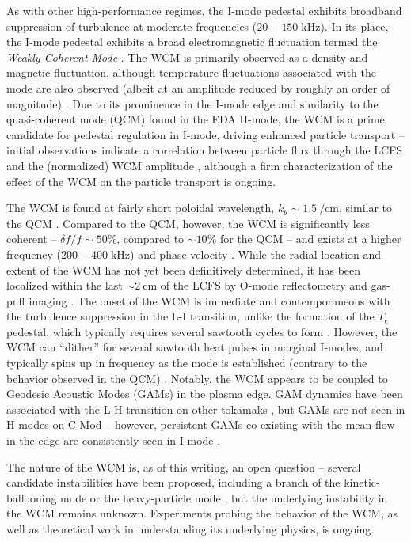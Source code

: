 As with other high-performance regimes, the I-mode pedestal exhibits broadband suppression of turbulence at moderate frequencies ($20-150\;\si{\kilo\hertz}$).  In its place, the I-mode pedestal exhibits a broad electromagnetic fluctuation termed the \emph{Weakly-Coherent Mode} \cite{Whyte2010}.  The WCM is primarily observed as a density and magnetic fluctuation, although temperature fluctuations associated with the mode are also observed (albeit at an amplitude reduced by roughly an order of magnitude) \cite{Cziegler2013,Dominguez2012,White2011}.  Due to its prominence in the I-mode edge and similarity to the quasi-coherent mode (QCM) found in the EDA H-mode, the WCM is a prime candidate for pedestal regulation in I-mode, driving enhanced particle transport -- initial observations indicate a correlation between particle flux through the LCFS and the (normalized) WCM amplitude \cite{Dominguez2012}, although a firm characterization of the effect of the WCM on the particle transport is ongoing.

The WCM is found at fairly short poloidal wavelength, $k_\theta \sim \SI{1.5}{\per\centi\meter}$, similar to the QCM \cite{Dominguez2012}.  Compared to the QCM, however, the WCM is significantly less coherent -- $\delta f/f \sim 50\%$, compared to $\sim 10\%$ for the QCM -- and exists at a higher frequency ($200-400\;\si{\kilo\hertz}$) and phase velocity \cite{Hubbard2011,Cziegler2013}.  While the radial location and extent of the WCM has not yet been definitively determined, it has been localized within the last $\sim \SI{2}{\centi\meter}$ of the LCFS by O-mode reflectometry \cite{Dominguez2012} and gas-puff imaging \cite{Cziegler2011,Cziegler2013}.  The onset of the WCM is immediate and contemporaneous with the turbulence suppression in the L-I transition, unlike the formation of the $T_e$ pedestal, which typically requires several sawtooth cycles to form \cite{Cziegler2011}.  However, the WCM can ``dither'' for several sawtooth heat pulses in marginal I-modes, and typically spins up in frequency as the 
mode is established (contrary to the behavior observed in the QCM) \cite{Cziegler2011,Hubbard2011}.  Notably, the WCM appears to be coupled to Geodesic Acoustic Modes (GAMs) \cite{Winsor1968} in the plasma edge.  GAM dynamics have been associated with the L-H transition on other tokamaks \cite{Schmitz2012,Manz2012}, but GAMs are not seen in H-modes on C-Mod -- however, persistent GAMs co-existing with the mean flow in the edge are consistently seen in I-mode \cite{Cziegler2013}.

The nature of the WCM is, as of this writing, an open question -- several candidate instabilities have been proposed, including a branch of the kinetic-ballooning mode \cite{Tang1980} or the heavy-particle mode \cite{Coppi2012,Coppi2012a}, but the underlying instability in the WCM remains unknown.  Experiments probing the behavior of the WCM, as well as theoretical work in understanding its underlying physics, is ongoing.\nicechapterending


